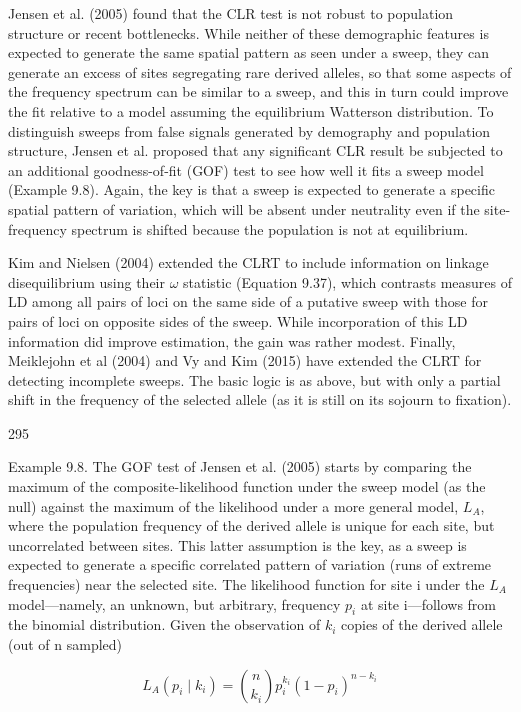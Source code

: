 \documentclass{article}
\begin{document}
Jensen et al. (2005) found that the CLR test is not robust to population structure or recent bottlenecks. While neither of these demographic features is expected to generate the same spatial pattern as seen under a sweep, they can generate an excess of sites segregating rare derived alleles, so that some aspects of the frequency spectrum can be similar to a sweep, and this in turn could improve the fit relative to a model assuming the equilibrium Watterson distribution. To distinguish sweeps from false signals generated by demography and population structure, Jensen et al. proposed that any significant CLR result be subjected to an additional goodness-of-fit (GOF) test to see how well it fits a sweep model (Example 9.8). Again, the key is that a sweep is expected to generate a specific spatial pattern of variation, which will be absent under neutrality even if the site-frequency spectrum is shifted because the population is not at equilibrium.

Kim and Nielsen (2004) extended the CLRT to include information on linkage disequilibrium using their  $ \omega $ statistic (Equation 9.37), which contrasts measures of LD among all pairs of loci on the same side of a putative sweep with those for pairs of loci on opposite sides of the sweep. While incorporation of this LD information did improve estimation, the gain was rather modest. Finally, Meiklejohn et al (2004) and Vy and Kim (2015) have extended the CLRT for detecting incomplete sweeps. The basic logic is as above, but with only a partial shift in the frequency of the selected allele (as it is still on its sojourn to fixation).

295

Example 9.8. The GOF test of Jensen et al. (2005) starts by comparing the maximum of the composite-likelihood function under the sweep model (as the null) against the maximum of the likelihood under a more general model,  $ L_A $, where the population frequency of the derived allele is unique for each site, but uncorrelated between sites. This latter assumption is the key, as a sweep is expected to generate a specific correlated pattern of variation (runs of extreme frequencies) near the selected site. The likelihood function for site i under the  $ L_A $ model—namely, an unknown, but arbitrary, frequency  $ p_i $ at site i—follows from the binomial distribution. Given the observation of  $ k_i $ copies of the derived allele (out of n sampled)

\begin{equation}
L_{A}(p_{i}\mid k_{i})=\binom{n}{k_{i}}p_{i}^{k_{i}}(1-p_{i})^{n-k_{i}}
\tag{9.17a}
\label{eq:9_17a}
\end{equation}
\end{document}
